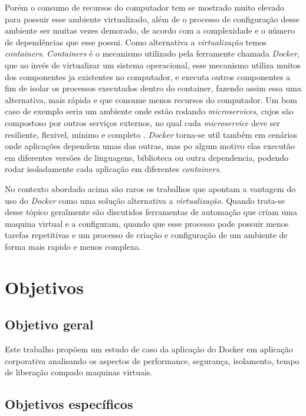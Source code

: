 \documentclass[11pt,a4paper]{article}
\begin{document}
Porém o consumo de recursos do computador tem se mostrado muito elevado para possuir esse ambiente virtualizado,
além de o processo de configuração desse ambiente ser muitas vezes demorado, de acordo com a complexidade e
o número de dependências que esse possui. Como alternativa a \textit{virtualização} temos \textit{containers}.
\textit{Containers} é o mecanismo utilizado pela ferramente chamada \textit{Docker}, que ao invés de virtualizar
um sistema operacional, esse mecanismo utiliza muitos dos componentes ja existentes no computador, e executa
outros componentes a fim de isolar os processos executados dentro do container\cite{TW_docker_for_builds},
fazendo assim essa uma alternativa, mais rápida e que consume menos recursos do computador\cite{DZone_CD_guide_v3}.
Um bom caso de exemplo seria um ambiente onde estão rodando \textit{microservices}, cujos são compostoso por
outros serviços externos, no qual cada \textit{microservice} deve ser resiliente, flexivel, mínimo e completo
\cite{Bugwadia_arch_constrains}. \textit{Docker} torna-se util também em cenários onde aplicações dependem umas
das outras, mas po algum motivo elas executão em diferentes versões de linguagens, biblioteca ou outra dependencia,
podendo rodar isoladamente cada aplicação em diferentes \textit{containers}\cite{Merkel_Docker}.

No contexto abordado acima são raros os trabalhos que apontam a vantagem do uso do \textit{Docker} como uma solução
alternativa a \textit{virtualização}\cite{Jafari_infra_as_a_code}. Quando trata-se desse tópico geralmente são
discutidos ferramentas de automação que criam uma maquina virtual e a configuram, quando que esse processo
pode possuir menos tarefas repetitivas e um processo de criação e configuração de um ambiente de forma mais
rapido e menos complexa.

\section{Objetivos}\label{sec:objetivos}

\subsection{Objetivo geral}

Este trabalho propõem um estudo de caso da aplicação do Docker em aplicação corporativa analisando os aspectos
de performance, segurança, isolamento, tempo de liberação compado maquinas virtuais.

\subsection{Objetivos específicos}
\end{document}
